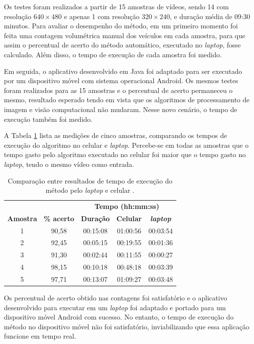 Os testes foram realizados a partir de 15 amostras de vídeos, sendo 14 com resolução $640\times 480$ e apenas 1 com resolução $320\times 240$, e duração média de 09:30 minutos. Para avaliar o desempenho do método, em um primeiro momento foi feita uma contagem volumétrica manual dos veículos em cada amostra, para que assim o percentual de acerto do método automático, executado no \textit{laptop}, fosse calculado. Além disso, o tempo de execução de cada amostra foi medido.

Em seguida, o aplicativo desenvolvido em Java foi adaptado para ser executado por um dispositivo móvel com sistema operacional Android. Os mesmos testes foram realizados para as 15 amostras e o percentual de acerto permaneceu o mesmo, resultado esperado tendo em vista que os algoritmos de processamento de imagem e visão computacional não mudaram. Nesse novo cenário, o tempo de execução também foi medido.

A Tabela \ref{tab:feitosa} lista as medições de cinco amostras, comparando os tempos de execução do algoritmo no celular e \textit{laptop}. Percebe-se em todas as amostras que o tempo gasto pelo algoritmo executado no celular foi maior que o tempo gasto no \textit{laptop}, tendo o mesmo vídeo como entrada. 

\begin{table}[ht]
  \caption{Comparação entre resultados de tempo de execução do método pelo \textit{laptop} e celular \citep{feitosa:2012:masther}.}
  \label{tab:feitosa}
  \begin{center}
    \begin{tabular}{ccccc}
    \toprule
    \multicolumn{2}{c}{} & \multicolumn{3}{c}{\textbf{Tempo (hh:mm:ss)}} \\
    \cline{3-5}
    \textbf{Amostra} & \textbf{\% acerto} & \textbf{Duração} & \textbf{Celular} & \textbf{\textit{laptop}}\\
    \midrule
      1 & 90,58 & 00:15:08 & 01:00:56 & 00:03:54\\
      2 & 92,45 & 00:05:15 & 00:19:55 & 00:01:36\\
      3 & 91,30 & 00:02:44 & 00:11:55 & 00:00:27\\
      4 & 98,15 & 00:10:18 & 00:48:18 & 00:03:39\\
      5 & 97,71 & 00:13:07 & 01:09:27 & 00:03:48\\
    \bottomrule
    \end{tabular}
  \end{center}
\end{table}

Os percentual de acerto obtido nas contagens foi satisfatório e o aplicativo desenvolvido para executar em um \textit{laptop} foi adaptado e portado para um dispositivo móvel Android com sucesso. No entanto, o tempo de execução do método no dispositivo móvel não foi satisfatório, inviabilizando que essa aplicação funcione em tempo real.


